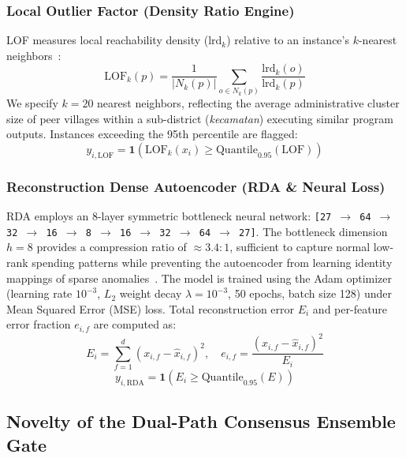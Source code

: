 \documentclass[conference]{IEEEtran}
\begin{document}
\subsubsection{Local Outlier Factor (Density Ratio Engine)}
LOF measures local reachability density ($\text{lrd}_k$) relative to an instance's $k$-nearest neighbors~\cite{ref24}:
\begin{equation}
\mathrm{LOF}_k(p) = \frac{1}{|N_k(p)|} \sum_{o \in N_k(p)} \frac{\mathrm{lrd}_k(o)}{\mathrm{lrd}_k(p)}
\end{equation}
We specify $k = 20$ nearest neighbors, reflecting the average administrative cluster size of peer villages within a sub-district (\textit{kecamatan}) executing similar program outputs. Instances exceeding the 95th percentile are flagged:
\begin{equation}
y_{i, \mathrm{LOF}} = \mathbf{1}\left(\mathrm{LOF}_k(x_i) \ge \mathrm{Quantile}_{0.95}(\mathrm{LOF})\right)
\end{equation}

\subsubsection{Reconstruction Dense Autoencoder (RDA \& Neural Loss)}
RDA employs an 8-layer symmetric bottleneck neural network: \texttt{[27 $\to$ 64 $\to$ 32 $\to$ 16 $\to$ 8 $\to$ 16 $\to$ 32 $\to$ 64 $\to$ 27]}. The bottleneck dimension $h = 8$ provides a compression ratio of $\approx 3.4:1$, sufficient to capture normal low-rank spending patterns while preventing the autoencoder from learning identity mappings of sparse anomalies~\cite{ref32}. The model is trained using the Adam optimizer (learning rate $10^{-3}$, $L_2$ weight decay $\lambda = 10^{-3}$, 50 epochs, batch size 128) under Mean Squared Error (MSE) loss. Total reconstruction error $E_i$ and per-feature error fraction $e_{i,f}$ are computed as:
\begin{equation}
E_i = \sum_{f=1}^{d} (x_{i,f} - \hat{x}_{i,f})^2, \quad e_{i,f} = \frac{(x_{i,f} - \hat{x}_{i,f})^2}{E_i}
\end{equation}
\begin{equation}
y_{i, \mathrm{RDA}} = \mathbf{1}\left(E_i \ge \mathrm{Quantile}_{0.95}(E)\right)
\end{equation}

\subsection{Novelty of the Dual-Path Consensus Ensemble Gate}
\end{document}
